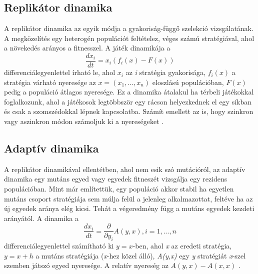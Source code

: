 \subsection{Replikátor dinamika}
A replikátor dinamika az egyik módja a gyakoriság-függő szelekció vizsgálatának. A megközelítés egy heterogén populációt feltételez, véges számú stratégiával, ahol a növekedés arányos a fitnesszel. A játék dinamikája a 
\begin{equation}
\frac{dx_i}{dt} = x_i(f_i(x) - F(x))
\end{equation}
differenciálegyenlettel írható le, ahol \(x_i\) az \textit{i} stratégia gyakorisága, \(f_i(x)\) a stratégia várható nyeresége az \(x = (x_1,...,x_n)\) eloszlású populációban, \(F(x)\) pedig a populáció átlagos nyeresége.
Ez a dinamika átalakul ha térbeli játékokkal foglalkozunk, ahol a játékosok legtöbbször egy rácson helyezkednek el egy síkban és csak a szomszédokkal lépnek kapcsolatba. Számít emellett az is, hogy szinkron vagy aszinkron módon számoljuk ki a nyereségeket \cite{hummert2014evolutionary}. 

\subsection{Adaptív dinamika}
A replikátor dinamikával ellentétben, ahol nem esik szó mutációról, az adaptív dinamika egy mutáns egyed vagy egyedek fitneszét vizsgálja egy rezidens populációban. Mint már említettük, egy populáció akkor stabil ha egyetlen mutáns csoport stratégiája sem múlja felül a jelenleg alkalmazottat, feltéve ha az új egyedek aránya elég kicsi. Tehát a végeredmény függ a mutáns egyedek  kezdeti arányától. A dinamika a 
\begin{equation}
\frac{dx_i}{dt} = \frac{\partial}{\partial y_i}A(y,x), i = 1,...,n
\end{equation}
differenciálegyenlettel számítható ki \(y = x\)-ben, ahol \textit{x} az eredeti stratégia, \(y = x + h\) a mutáns stratégiája (\textit{x}-hez közel álló), \textit{A(y,x)} egy \textit{y} stratégiát \textit{x}-szel szemben játszó egyed nyeresége. A relatív nyereség az \(A(y,x) - A(x,x)\) \cite{hummert2014evolutionary}.
